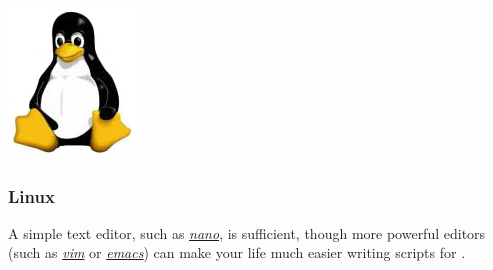 \begin{flushleft}
	\begin{minipage}[c]{0.074\textwidth}
   		\includegraphics[width=\textwidth]{figures/figlogolinux.jpg}
	\end{minipage}
	\quad
	\begin{minipage}[t]{0.88\textwidth}
	   	\subsubsection{Linux} 
	\end{minipage}

    A simple text editor, such as \href{http://www.nano-editor.org/}{\emph{nano}}, is sufficient, though more powerful
    editors (such as \href{http://www.vim.org}{\emph{vim}} or
    \href{http://www.gnu.org/software/emacs/}{\emph{emacs}}) can make your life much
    easier writing scripts for \poy.

\end{flushleft}

